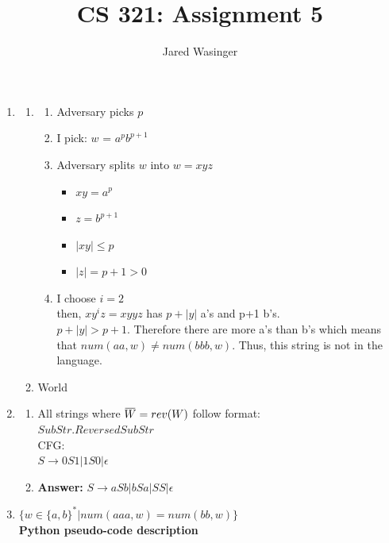 \documentclass{article}
\newcommand{\overbar}[1]{\mkern 1.5mu\overline{\mkern-1.5mu#1\mkern-1.5mu}\mkern 1.5mu}
\begin{document}
  \title{CS 321: Assignment 5}
  \author{Jared Wasinger}

  \maketitle

	\begin{enumerate}
		\item\begin{enumerate}
			\item\begin{enumerate}
				\item Adversary picks $p$
				\item I pick: $w$ = $a^pb^{p+1}$\\
				\item Adversary splits $w$ into $w=xyz$
					\begin{itemize}
						\item $xy = a^{p}$ 
						\item$z=b^{p+1}$
						\item$|xy| \leq p$
						\item$|z| = p+1 > 0$
					\end{itemize}
			  \item I choose $i = 2$\\
					then, $xy^iz = xyyz$ has $p + |y|$ a's and p+1 b's.\\
					$p+|y| > p+1$.  Therefore there are more a's than b's which means that $num(aa,w) \neq num(bbb,w)$. Thus, this string is not in the language.
				\end{enumerate}
			\item World
			\end{enumerate}
		\item\begin{enumerate}
		  \item 
						All strings where $\overbar{W} = rev(W)$  follow format:\\
						$SubStr.ReversedSubStr$\\
						CFG:\\
						$S \rightarrow 0S1 | 1S0 | \epsilon$
			\item 
				\textbf{Answer:} $S \rightarrow aSb | bSa | SS | \epsilon$\\
			\end{enumerate}
		\item $\{ w \in \{a,b\}^* | num(aaa,w) = num(bb,w)\}$\\
			\textbf{Python pseudo-code description}\begin{verbatim}
					

\end{verbatim}
\end{enumerate}
\end{document}
